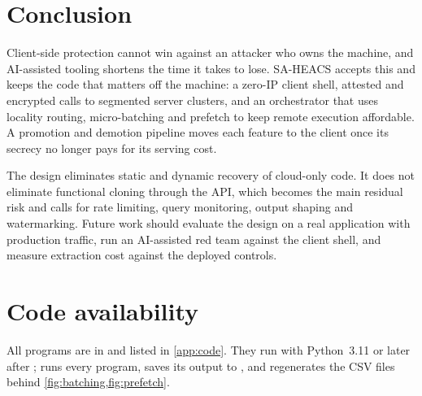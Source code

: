 \section{Conclusion}\label{sec:conclusion}

Client-side protection cannot win against an attacker who owns the machine, and AI-assisted
tooling shortens the time it takes to lose. SA-HEACS accepts this and keeps the code that
matters off the machine: a zero-IP client shell, attested and encrypted calls to segmented
server clusters, and an orchestrator that uses locality routing, micro-batching and prefetch
to keep remote execution affordable. A promotion and demotion pipeline moves each feature to
the client once its secrecy no longer pays for its serving cost.

The design eliminates static and dynamic recovery of cloud-only code. It does not eliminate
functional cloning through the API, which becomes the main residual risk and calls for rate
limiting, query monitoring, output shaping and watermarking. Future work should evaluate the
design on a real application with production traffic, run an AI-assisted red team against
the client shell, and measure extraction cost against the deployed controls.

\section*{Code availability}
All programs are in  and listed in \cref{app:code}. They run with
Python~3.11 or later after ;  runs
every program, saves its output to , and regenerates the CSV files
behind \cref{fig:batching,fig:prefetch}.
